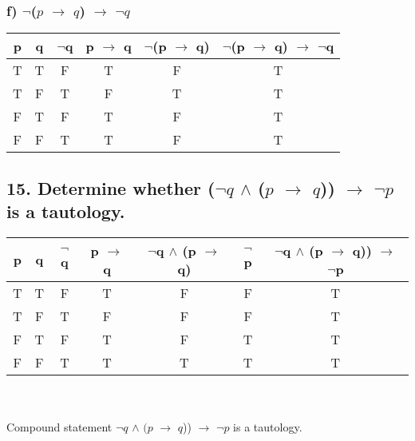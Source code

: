 \documentclass[11pt, oneside]{article} %
\numberwithin{equation}{section} %
\numberwithin{figure}{section} %
\numberwithin{table}{section} %
\begin{document}
\begin{table}[!htbp]
\subsubsection{f) $\neg$($p$ $\rightarrow$ $q$) $\rightarrow$ $\neg$$q$}
\begin{tabular}{c c c c c c}
\hline\hline
p & q & $\neg$q & p $\rightarrow$ q & $\neg$(p $\rightarrow$ q) & $\neg$(p $\rightarrow$ q) $\rightarrow$ $\neg$q\\ [0.5ex] 
\hline
T & T & F & T & F & T\\
T & F & T & F & T & T\\
F & T & F & T & F & T\\
F & F & T & T & F & T\\ [1ex]
\hline
\end{tabular}
\label{table:nonlin}
\end{table}

\begin{table}[!htbp]
\subsection{15. Determine whether ($\neg$$q$ $\wedge$ ($p$ $\rightarrow$ $q$)) $\rightarrow$ $\neg$$p$ is a tautology.}
\begin{tabular}{c c c c c c c}
\hline\hline
p & q & $\neg$q & p $\rightarrow$ q & $\neg$q $\wedge$ (p $\rightarrow$ q) & $\neg$p & $\neg$q $\wedge$ (p $\rightarrow$ q)) $\rightarrow$ $\neg$p\\ [0.5ex] 
\hline
T & T & F & T & F & F & T\\
T & F & T & F & F & F & T\\
F & T & F & T & F & T & T\\
F & F & T & T & T & T & T\\ [1ex]
\hline
\end{tabular}
\\\\
Compound statement $\neg$$q$ $\wedge$ $(p$ $\rightarrow$ $q$)) $\rightarrow$ $\neg$$p$ is a tautology. \\
\label{table:nonlin}
\end{table}
\end{document}
